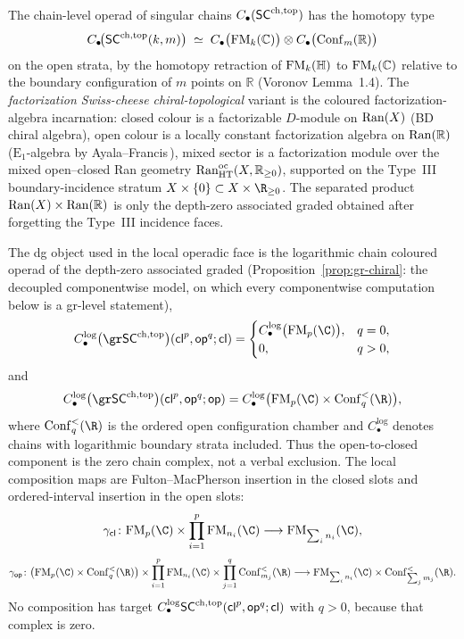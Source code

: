 \begin{definition}
The chain-level operad of singular chains $C_\bullet(\mathsf{SC}^{\mathrm{ch},\mathrm{top}})$ has
the homotopy type
\begin{equation}\label{eq:scchtop-arity-decomp}
 C_\bullet\!\bigl(\mathsf{SC}^{\mathrm{ch},\mathrm{top}}(k,m)\bigr)
 \;\simeq\;
 C_\bullet\bigl(\mathrm{FM}_k(\mathbb{C})\bigr)\otimes
 C_\bullet\bigl(\mathrm{Conf}_m(\mathbb{R})\bigr)
\end{equation}
on the open strata, by the homotopy retraction of $\mathrm{FM}_k(\mathbb{H})$
to $\mathrm{FM}_k(\mathbb{C})$ relative to the boundary configuration of $m$
points on $\mathbb{R}$ (Voronov\,\cite{Voronov1998}\,Lemma~1.4). The
\emph{factorization Swiss-cheese chiral-topological} variant is the
coloured factorization-algebra incarnation: closed colour is a
factorizable $D$-module on $\mathrm{Ran}(X)$ (BD chiral algebra), open colour
is a locally constant factorization algebra on $\mathrm{Ran}(\mathbb{R})$
($\mathrm{E}_1$-algebra by Ayala--Francis\,\cite{AF15}), mixed sector
is a factorization module over the mixed open--closed Ran geometry
$\mathrm{Ran}^{\mathrm{oc}}_{\mathrm{HT}}(X,\mathbb{R}_{\geq 0})$, supported
on the Type~III boundary-incidence stratum
$X\times\{0\}\subset X\times\R_{\geq 0}$. The separated product
$\mathrm{Ran}(X)\times\mathrm{Ran}(\mathbb{R})$ is only the depth-zero associated
graded obtained after forgetting the Type~III incidence faces.

The dg object used in the local operadic face is the logarithmic
chain coloured operad of the depth-zero associated graded
(Proposition~\ref{prop:gr-chiral}: the decoupled componentwise
model, on which every componentwise computation below is a
gr-level statement),
\[
C_\bullet^{\log}\bigl(\gr\SCchtop\bigr)(\mathsf{cl}^{p},\mathsf{op}^{q};\mathsf{cl})
=
\begin{cases}
C_\bullet^{\log}\bigl(\FM_p(\C)\bigr), & q=0,\\
0, & q>0,
\end{cases}
\]
and
\[
C_\bullet^{\log}\bigl(\gr\SCchtop\bigr)(\mathsf{cl}^{p},\mathsf{op}^{q};\mathsf{op})
=
C_\bullet^{\log}\bigl(\FM_p(\C)\times\Conf_q^{<}(\R)\bigr),
\]
where \(\Conf_q^{<}(\R)\) is the ordered open configuration chamber
and \(C_\bullet^{\log}\) denotes chains with logarithmic boundary
strata included. Thus the open-to-closed component is the zero chain
complex, not a verbal exclusion. The local composition maps are
Fulton--MacPherson insertion in the closed slots and ordered-interval
insertion in the open slots:
\[
\gamma_{\mathsf{cl}}\colon
\FM_p(\C)\times\prod_{i=1}^{p}\FM_{n_i}(\C)
\longrightarrow
\FM_{\sum_i n_i}(\C),
\]
\[
\gamma_{\mathsf{op}}\colon
\bigl(\FM_p(\C)\times\Conf_q^{<}(\R)\bigr)
\times\prod_{i=1}^{p}\FM_{n_i}(\C)
\times\prod_{j=1}^{q}\Conf_{m_j}^{<}(\R)
\longrightarrow
\FM_{\sum_i n_i}(\C)\times\Conf_{\sum_j m_j}^{<}(\R).
\]
No composition has target
\(C_\bullet^{\log}\mathsf{SC}^{\mathrm{ch},\mathrm{top}}(\mathsf{cl}^{p},\mathsf{op}^{q};\mathsf{cl})\)
with \(q>0\), because that complex is zero.


\end{definition}
